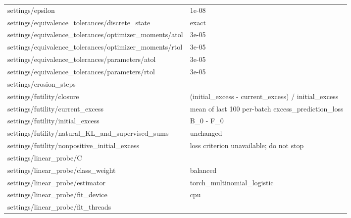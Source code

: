 \begin{longtable}{@{}>{\raggedright\arraybackslash}p{2.000in}>{\raggedright\arraybackslash}p{3.900in}@{}}
settings/\allowbreak{}epsilon & 1e-08 \\
settings/\allowbreak{}equivalence\_\allowbreak{}tolerances/\allowbreak{}discrete\_\allowbreak{}state & exact \\
settings/\allowbreak{}equivalence\_\allowbreak{}tolerances/\allowbreak{}optimizer\_\allowbreak{}moments/\allowbreak{}atol & 3e-05 \\
settings/\allowbreak{}equivalence\_\allowbreak{}tolerances/\allowbreak{}optimizer\_\allowbreak{}moments/\allowbreak{}rtol & 3e-05 \\
settings/\allowbreak{}equivalence\_\allowbreak{}tolerances/\allowbreak{}parameters/\allowbreak{}atol & 3e-05 \\
settings/\allowbreak{}equivalence\_\allowbreak{}tolerances/\allowbreak{}parameters/\allowbreak{}rtol & 3e-05 \\
settings/\allowbreak{}erosion\_\allowbreak{}steps & 200 \\
settings/\allowbreak{}futility/\allowbreak{}closure & (initial\_\allowbreak{}excess - current\_\allowbreak{}excess) /\allowbreak{} initial\_\allowbreak{}excess \\
settings/\allowbreak{}futility/\allowbreak{}current\_\allowbreak{}excess & mean of last 100 per-batch excess\_\allowbreak{}prediction\_\allowbreak{}loss \\
settings/\allowbreak{}futility/\allowbreak{}initial\_\allowbreak{}excess & B\_\allowbreak{}0 - F\_\allowbreak{}0 \\
settings/\allowbreak{}futility/\allowbreak{}natural\_\allowbreak{}KL\_\allowbreak{}and\_\allowbreak{}supervised\_\allowbreak{}sums & unchanged \\
settings/\allowbreak{}futility/\allowbreak{}nonpositive\_\allowbreak{}initial\_\allowbreak{}excess & loss criterion unavailable; do not stop \\
settings/\allowbreak{}linear\_\allowbreak{}probe/\allowbreak{}C & 10 \\
settings/\allowbreak{}linear\_\allowbreak{}probe/\allowbreak{}class\_\allowbreak{}weight & balanced \\
settings/\allowbreak{}linear\_\allowbreak{}probe/\allowbreak{}estimator & torch\_\allowbreak{}multinomial\_\allowbreak{}logistic \\
settings/\allowbreak{}linear\_\allowbreak{}probe/\allowbreak{}fit\_\allowbreak{}device & cpu \\
settings/\allowbreak{}linear\_\allowbreak{}probe/\allowbreak{}fit\_\allowbreak{}threads & 1 \\

\end{longtable}
